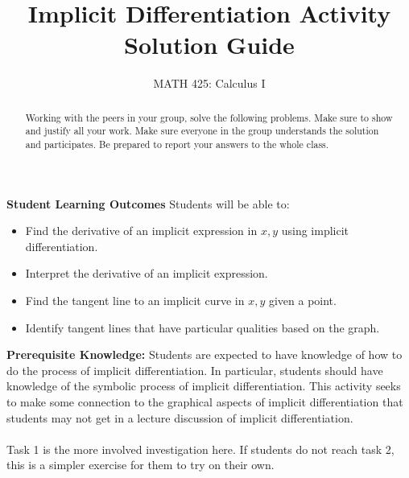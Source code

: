 \documentclass{ximera}
\title{Implicit Differentiation Activity Solution Guide}
\author{MATH 425: Calculus I}
\begin{document}
\begin{abstract}
    Working with the peers in your group, solve the following problems. Make sure to show and justify all your work. Make sure everyone in the group understands the solution and participates. Be prepared to report your answers to the whole class. 
\end{abstract}
\maketitle

\textbf{Student Learning Outcomes}
Students will be able to:
  \begin{itemize}
    \item Find the derivative of an implicit expression in $x,y$ using implicit differentiation.
    \item Interpret the derivative of an implicit expression.
    \item Find the tangent line to an implicit curve in $x,y$ given a point.
    \item Identify tangent lines that have particular qualities based on the graph.
  \end{itemize}
\textbf{Prerequisite Knowledge:} Students are expected to have knowledge of how to do the process of implicit differentiation.  In particular, students should have knowledge of the symbolic process of implicit differentiation.  This activity seeks to make some connection to the graphical aspects of implicit differentiation that students may not get in a lecture discussion of implicit differentiation.\\
\\
Task 1 is the more involved investigation here.  If students do not reach task 2, this is a simpler exercise for them to try on their own.
\end{document}
